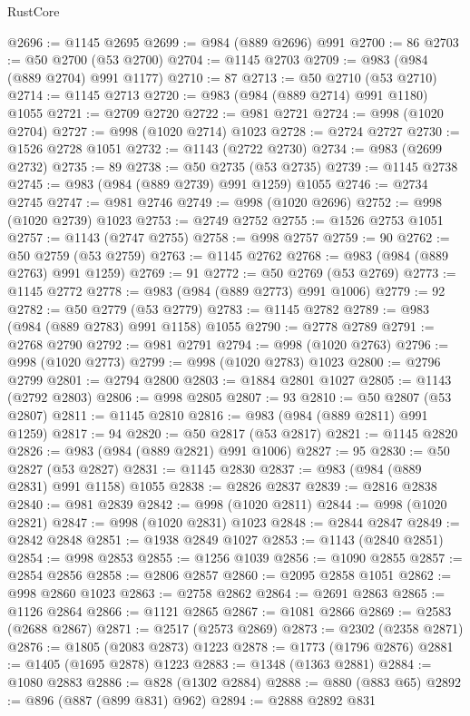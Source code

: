 \begin{lexlean}{RustCore}
\begin{coremodule}
@2696 := @1145 @2695
@2699 := @984 (@889 @2696) @991
@2700 := 86
@2703 := @50 @2700 (@53 @2700)
@2704 := @1145 @2703
@2709 := @983 (@984 (@889 @2704) @991 @1177)
@2710 := 87
@2713 := @50 @2710 (@53 @2710)
@2714 := @1145 @2713
@2720 := @983 (@984 (@889 @2714) @991 @1180) @1055
@2721 := @2709 @2720
@2722 := @981 @2721
@2724 := @998 (@1020 @2704)
@2727 := @998 (@1020 @2714) @1023
@2728 := @2724 @2727
@2730 := @1526 @2728 @1051
@2732 := @1143 (@2722 @2730)
@2734 := @983 (@2699 @2732)
@2735 := 89
@2738 := @50 @2735 (@53 @2735)
@2739 := @1145 @2738
@2745 := @983 (@984 (@889 @2739) @991 @1259) @1055
@2746 := @2734 @2745
@2747 := @981 @2746
@2749 := @998 (@1020 @2696)
@2752 := @998 (@1020 @2739) @1023
@2753 := @2749 @2752
@2755 := @1526 @2753 @1051
@2757 := @1143 (@2747 @2755)
@2758 := @998 @2757
@2759 := 90
@2762 := @50 @2759 (@53 @2759)
@2763 := @1145 @2762
@2768 := @983 (@984 (@889 @2763) @991 @1259)
@2769 := 91
@2772 := @50 @2769 (@53 @2769)
@2773 := @1145 @2772
@2778 := @983 (@984 (@889 @2773) @991 @1006)
@2779 := 92
@2782 := @50 @2779 (@53 @2779)
@2783 := @1145 @2782
@2789 := @983 (@984 (@889 @2783) @991 @1158) @1055
@2790 := @2778 @2789
@2791 := @2768 @2790
@2792 := @981 @2791
@2794 := @998 (@1020 @2763)
@2796 := @998 (@1020 @2773)
@2799 := @998 (@1020 @2783) @1023
@2800 := @2796 @2799
@2801 := @2794 @2800
@2803 := @1884 @2801 @1027
@2805 := @1143 (@2792 @2803)
@2806 := @998 @2805
@2807 := 93
@2810 := @50 @2807 (@53 @2807)
@2811 := @1145 @2810
@2816 := @983 (@984 (@889 @2811) @991 @1259)
@2817 := 94
@2820 := @50 @2817 (@53 @2817)
@2821 := @1145 @2820
@2826 := @983 (@984 (@889 @2821) @991 @1006)
@2827 := 95
@2830 := @50 @2827 (@53 @2827)
@2831 := @1145 @2830
@2837 := @983 (@984 (@889 @2831) @991 @1158) @1055
@2838 := @2826 @2837
@2839 := @2816 @2838
@2840 := @981 @2839
@2842 := @998 (@1020 @2811)
@2844 := @998 (@1020 @2821)
@2847 := @998 (@1020 @2831) @1023
@2848 := @2844 @2847
@2849 := @2842 @2848
@2851 := @1938 @2849 @1027
@2853 := @1143 (@2840 @2851)
@2854 := @998 @2853
@2855 := @1256 @1039
@2856 := @1090 @2855
@2857 := @2854 @2856
@2858 := @2806 @2857
@2860 := @2095 @2858 @1051
@2862 := @998 @2860 @1023
@2863 := @2758 @2862
@2864 := @2691 @2863
@2865 := @1126 @2864
@2866 := @1121 @2865
@2867 := @1081 @2866
@2869 := @2583 (@2688 @2867)
@2871 := @2517 (@2573 @2869)
@2873 := @2302 (@2358 @2871)
@2876 := @1805 (@2083 @2873) @1223
@2878 := @1773 (@1796 @2876)
@2881 := @1405 (@1695 @2878) @1223
@2883 := @1348 (@1363 @2881)
@2884 := @1080 @2883
@2886 := @828 (@1302 @2884)
@2888 := @880 (@883 @65)
@2892 := @896 (@887 (@899 @831) @962)
@2894 := @2888 @2892 @831

\end{coremodule}
\end{lexlean}
